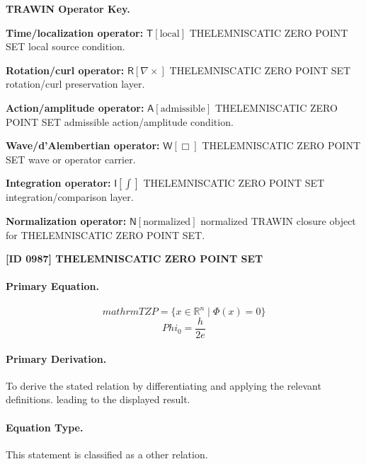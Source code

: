 \par\vspace{0.45\baselineskip}
\noindent\begin{minipage}[t]{\linewidth}
\begingroup
\small
\raggedright
\textbf{TRAWIN Operator Key.}\par
\noindent\textbf{Time/localization operator:} $\mathsf{T}\!\left[\mathrm{local}\right]$ THELEMNISCATIC ZERO POINT SET local source condition.\par
\noindent\textbf{Rotation/curl operator:} $\mathsf{R}\!\left[\nabla\times\right]$ THELEMNISCATIC ZERO POINT SET rotation/curl preservation layer.\par
\noindent\textbf{Action/amplitude operator:} $\mathsf{A}\!\left[\mathrm{admissible}\right]$ THELEMNISCATIC ZERO POINT SET admissible action/amplitude condition.\par
\noindent\textbf{Wave/d'Alembertian operator:} $\mathsf{W}\!\left[\Box\right]$ THELEMNISCATIC ZERO POINT SET wave or operator carrier.\par
\noindent\textbf{Integration operator:} $\mathsf{I}\!\left[\int\right]$ THELEMNISCATIC ZERO POINT SET integration/comparison layer.\par
\noindent\textbf{Normalization operator:} $\mathsf{N}\!\left[\mathrm{normalized}\right]$ normalized TRAWIN closure object for THELEMNISCATIC ZERO POINT SET.\par
\endgroup
\end{minipage}

\clearpage
\noindent\textbf{[ID 0987] THELEMNISCATIC ZERO POINT SET}\par
\vspace{0.35em}
\paragraph{Primary Equation.}
\[
mathrm{TZP}=\{x\in\mathbb{R}^{n}\mid \Phi(x)=0\}
\]
\[
Phi_{0}=\frac{h}{2e}
\]

\paragraph{Primary Derivation.}
To derive the stated relation by differentiating and applying the relevant definitions. leading to the displayed result.
\paragraph{Equation Type.}
This statement is classified as a other relation.


